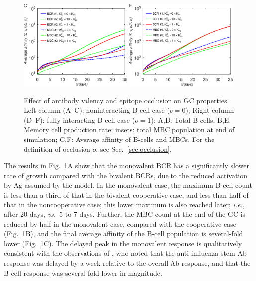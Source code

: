 \documentclass[utf8]{frontiersHLTH}%
\def\ie {{\it i.e.}}
\def\vs {{\it vs.}}
\newcommand{\fig}[1]{Fig.~\ref{fig:#1}}
\newcommand{\Sec}[1]{Sec.~\ref{sec:#1}}
\renewcommand{\sec}[1]{\Sec{#1}}
\begin{document}
{\begin{figure}
\includegraphics[width=0.49\textwidth]{../fig4abc/A.eps}
\includegraphics[width=0.49\textwidth]{../fig4def/A.eps}
\caption{Effect of antibody valency and epitope occlusion on GC properties.
Left column (A--C): noninteracting B-cell case ($o=0$);
Right column (D--F): fully interacting B-cell case ($o=1$);
A,D: Total B cells;
B,E: Memory cell production rate; insets: total MBC population at end of simulation;
C,F: Average affinity of B-cells and MBCs.  For the definition of occlusion $o$, see \sec{occlusion}.
}
\label{fig:avidity}
\end{figure}
}

The results in \fig{avidity}A show that the monovalent BCR has a
significantly slower rate of growth compared with the bivalent BCRs, due to
the reduced activation by Ag assumed by the model. In the monovalent case,
the maximum B-cell count is less than a third of that in the bivalent
cooperative case, and less than half of that in the noncooperative case;
this lower maximum is also reached later; \ie, after 20 days, \vs~5 to 7 days.
Further,
the MBC count at the end of the GC is reduced by half in the monovalent case, compared with the cooperative case
(\fig{avidity}B), and the final average
affinity of the B-cell population is several-fold lower (\fig{avidity}C).
The delayed peak in the
monovalent response is qualitatively consistent with the observations of \citet{tan19},
who noted that the anti-influenza stem Ab response was delayed by a week relative
to the overall Ab response, and that the B-cell response was several-fold
lower in magnitude.
\end{document}
